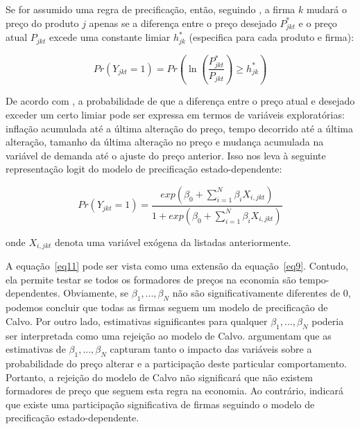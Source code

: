 \documentclass[twoside,a4paper,11pt]{report}
\begin{document}
Se for assumido uma regra de precificação, então, seguindo \citet{cecchetti1986frequency}, a firma $k$ mudará o preço do produto $j$ apenas se a diferença entre o preço desejado $P_{jkt}^{*}$ e o preço atual $P_{jkt}$ excede uma constante limiar $h_{jk}^{*}$ (especifica para cada produto e firma):

\begin{equation}\label{eq10}
Pr\left( { Y }_{ jkt }=1 \right) =Pr\left( \ln { \left( \frac { { P }_{ jkt }^{ * } }{ { P }_{ jkt } }  \right) \ge { h }_{ jk }^{ * } }  \right) 
\end{equation}

De acordo com \citet{cecchetti1986frequency}, a probabilidade de que a diferença entre o preço atual e desejado exceder um certo limiar pode ser expressa em termos de variáveis exploratórias: inflação acumulada até a última alteração do preço, tempo decorrido até a última alteração, tamanho da última alteração no preço e mudança acumulada na variável de demanda até o ajuste do preço anterior. Isso nos leva à seguinte representação logit do modelo de precificação estado-dependente:

\begin{equation}\label{eq11}
Pr\left( { Y }_{ jkt }=1 \right) =\frac { exp\left( { \beta  }_{ 0 }+\sum _{ i=1 }^{ N }{ { \beta  }_{ i }{ X }_{ i,jkt } }  \right)  }{ 1+exp\left( { \beta  }_{ 0 }+\sum _{ i=1 }^{ N }{ { \beta  }_{ i }{ X }_{ i,jkt } }  \right)  } 
\end{equation}

\noindent onde ${ X }_{ i,jkt }$ denota uma variável exógena da listadas anteriormente.

A equação~\ref{eq11} pode ser vista como uma extensão da equação~\ref{eq9}. Contudo, ela permite testar se todos os formadores de preços na economia são tempo-dependentes. Obviamente, se $\beta_{1},...,\beta_{N}$ não são significativamente diferentes de 0, podemos concluir que todas as firmas seguem um modelo de precificação de Calvo. Por outro lado, estimativas significantes para qualquer $\beta_{1},...,\beta_{N}$ poderia ser interpretada como uma rejeição ao modelo de Calvo. \citet{aucremanne2005time} argumentam que as estimativas de $\beta_{1},...,\beta_{N}$ capturam tanto o impacto das variáveis sobre a probabilidade do preço alterar e a participação deste particular comportamento. Portanto, a rejeição do modelo de Calvo não significará que não existem formadores de preço que seguem esta regra na economia. Ao contrário, indicará que existe uma participação significativa de firmas seguindo o modelo de precificação estado-dependente.
\end{document}
